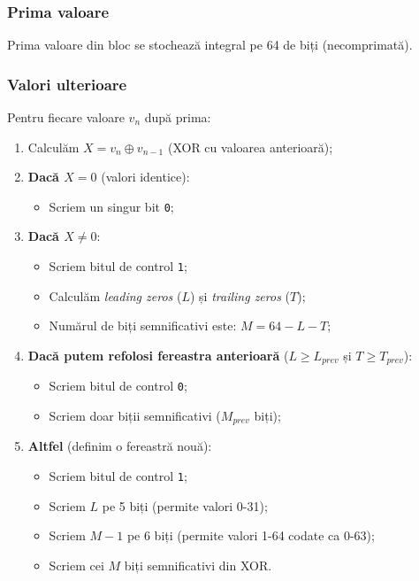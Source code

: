 \subsubsection{Prima valoare}
Prima valoare din bloc se stochează integral pe 64 de biți (necomprimată).

\subsubsection{Valori ulterioare}
Pentru fiecare valoare $v_n$ după prima:

\begin{enumerate}
    \item Calculăm $X = v_n \oplus v_{n-1}$ (XOR cu valoarea anterioară);

    \item \textbf{Dacă $X = 0$} (valori identice):
    \begin{itemize}
        \item Scriem un singur bit \texttt{0};
    \end{itemize}

    \item \textbf{Dacă $X \neq 0$}:
    \begin{itemize}
        \item Scriem bitul de control \texttt{1};
        \item Calculăm \textit{leading zeros} ($L$) și \textit{trailing zeros} ($T$);
        \item Numărul de biți semnificativi este: $M = 64 - L - T$;
    \end{itemize}

    \item \textbf{Dacă putem refolosi fereastra anterioară} ($L \geq L_{prev}$ și $T \geq T_{prev}$):
    \begin{itemize}
        \item Scriem bitul de control \texttt{0};
        \item Scriem doar biții semnificativi ($M_{prev}$ biți);
    \end{itemize}

    \item \textbf{Altfel} (definim o fereastră nouă):
    \begin{itemize}
        \item Scriem bitul de control \texttt{1};
        \item Scriem $L$ pe 5 biți (permite valori 0-31);
        \item Scriem $M - 1$ pe 6 biți (permite valori 1-64 codate ca 0-63);
        \item Scriem cei $M$ biți semnificativi din XOR.
    \end{itemize}
\end{enumerate}

